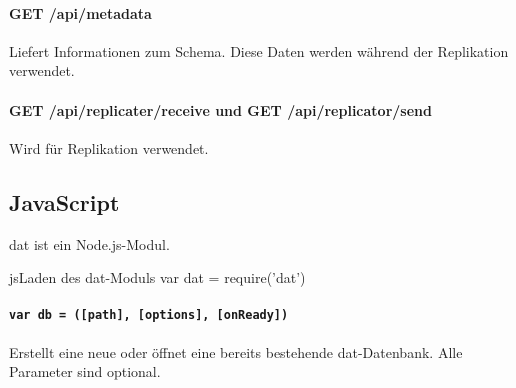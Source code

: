 \paragraph{GET /api/metadata}
Liefert Informationen zum Schema. Diese Daten werden während der Replikation verwendet.

\paragraph{GET /api/replicater/receive und GET /api/replicator/send}
Wird für Replikation verwendet.

\subsection{JavaScript}
dat ist ein Node.js-Modul.

\begin{srclst}{js}{Laden des dat-Moduls}
var dat = require('dat')
\end{srclst}

\paragraph{\texttt{var db = ([path], [options], [onReady])}}

Erstellt eine neue oder öffnet eine bereits bestehende dat-Datenbank. Alle Parameter sind optional.


